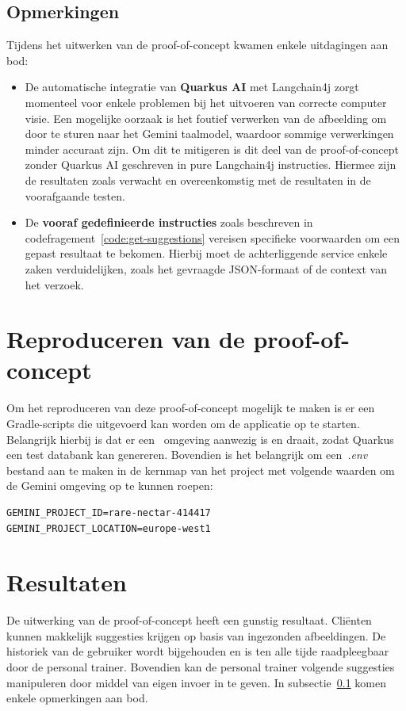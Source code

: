 \subsection{Opmerkingen}
\label{subsec:opmerkingen}
Tijdens het uitwerken van de proof-of-concept kwamen enkele uitdagingen aan bod:
\begin{itemize}
    \item De automatische integratie van \textbf{Quarkus AI} met Langchain4j zorgt momenteel voor enkele problemen bij het uitvoeren van correcte computer visie.
    Een mogelijke oorzaak is het foutief verwerken van de afbeelding om door te sturen naar het Gemini taalmodel, waardoor sommige verwerkingen minder accuraat zijn.
    Om dit te mitigeren is dit deel van de proof-of-concept zonder Quarkus AI geschreven in pure Langchain4j instructies.
    Hiermee zijn de resultaten zoals verwacht en overeenkomstig met de resultaten in de voorafgaande testen.
    \item De \textbf{vooraf gedefinieerde instructies} zoals beschreven in codefragement~\ref{code:get-suggestions} vereisen specifieke voorwaarden om een gepast resultaat te bekomen.
    Hierbij moet de achterliggende service enkele zaken verduidelijken, zoals het gevraagde JSON-formaat of de context van het verzoek.
\end{itemize}

\section{Reproduceren van de proof-of-concept}
\label{sec:reproduceren-van-de-proof-of-concept}
Om het reproduceren van deze proof-of-concept mogelijk te maken is er een Gradle-scripts die uitgevoerd kan worden om de applicatie op te starten.
Belangrijk hierbij is dat er een~ omgeving aanwezig is en draait, zodat Quarkus een test databank kan genereren.
Bovendien is het belangrijk om een~\textit{.env} bestand aan te maken in de kernmap van het project met volgende waarden om de Gemini omgeving op te kunnen roepen:
\begin{listing}[H]
    \begin{verbatim}
GEMINI_PROJECT_ID=rare-nectar-414417
GEMINI_PROJECT_LOCATION=europe-west1
    \end{verbatim}
\end{listing}

\section{Resultaten}
\label{sec:resultaten}
De uitwerking van de proof-of-concept heeft een gunstig resultaat.
Cliënten kunnen makkelijk suggesties krijgen op basis van ingezonden afbeeldingen.
De historiek van de gebruiker wordt bijgehouden en is ten alle tijde raadpleegbaar door de personal trainer.
Bovendien kan de personal trainer volgende suggesties manipuleren door middel van eigen invoer in te geven.
In subsectie~\ref{subsec:opmerkingen} komen enkele opmerkingen aan bod.